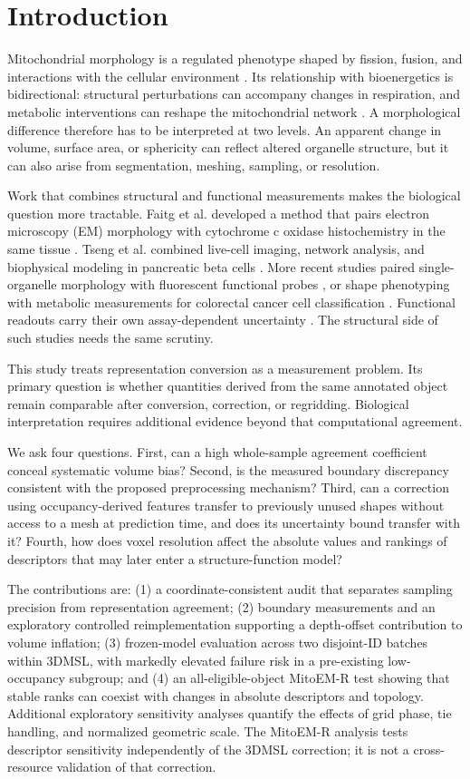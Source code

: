 \documentclass[journal]{IEEEtran}
\begin{document}
\section{Introduction}

Mitochondrial morphology is a regulated phenotype shaped by fission, fusion, and interactions with the cellular environment \cite{ref1}. Its relationship with bioenergetics is bidirectional: structural perturbations can accompany changes in respiration, and metabolic interventions can reshape the mitochondrial network \cite{ref2}. A morphological difference therefore has to be interpreted at two levels. An apparent change in volume, surface area, or sphericity can reflect altered organelle structure, but it can also arise from segmentation, meshing, sampling, or resolution.

Work that combines structural and functional measurements makes the biological question more tractable. Faitg et al. developed a method that pairs electron microscopy (EM) morphology with cytochrome c oxidase histochemistry in the same tissue \cite{ref3}. Tseng et al. combined live-cell imaging, network analysis, and biophysical modeling in pancreatic beta cells \cite{ref4}. More recent studies paired single-organelle morphology with fluorescent functional probes \cite{ref5}, or shape phenotyping with metabolic measurements for colorectal cancer cell classification \cite{ref6}. Functional readouts carry their own assay-dependent uncertainty \cite{ref7}. The structural side of such studies needs the same scrutiny.

This study treats representation conversion as a measurement problem. Its primary question is whether quantities derived from the same annotated object remain comparable after conversion, correction, or regridding. Biological interpretation requires additional evidence beyond that computational agreement.

We ask four questions. First, can a high whole-sample agreement coefficient conceal systematic volume bias? Second, is the measured boundary discrepancy consistent with the proposed preprocessing mechanism? Third, can a correction using occupancy-derived features transfer to previously unused shapes without access to a mesh at prediction time, and does its uncertainty bound transfer with it? Fourth, how does voxel resolution affect the absolute values and rankings of descriptors that may later enter a structure-function model?

The contributions are: (1) a coordinate-consistent audit that separates sampling precision from representation agreement; (2) boundary measurements and an exploratory controlled reimplementation supporting a depth-offset contribution to volume inflation; (3) frozen-model evaluation across two disjoint-ID batches within 3DMSL, with markedly elevated failure risk in a pre-existing low-occupancy subgroup; and (4) an all-eligible-object MitoEM-R test showing that stable ranks can coexist with changes in absolute descriptors and topology. Additional exploratory sensitivity analyses quantify the effects of grid phase, tie handling, and normalized geometric scale. The MitoEM-R analysis tests descriptor sensitivity independently of the 3DMSL correction; it is not a cross-resource validation of that correction.
\end{document}
